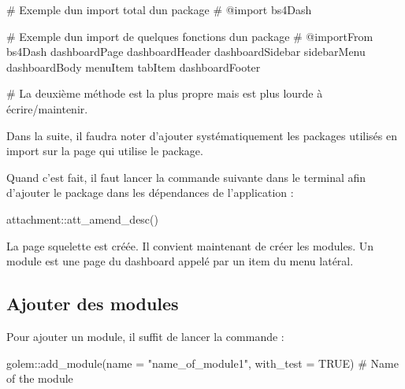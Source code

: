 \documentclass[
  letterpaper,
  DIV=11,
  numbers=noendperiod]{scrreprt}
\newenvironment{Shaded}{\begin{snugshade}}{\end{snugshade}}
\newcommand{\AttributeTok}[1]{\textcolor[rgb]{0.40,0.45,0.13}{#1}}
\newcommand{\CommentTok}[1]{\textcolor[rgb]{0.37,0.37,0.37}{#1}}
\newcommand{\ConstantTok}[1]{\textcolor[rgb]{0.56,0.35,0.01}{#1}}
\newcommand{\FunctionTok}[1]{\textcolor[rgb]{0.28,0.35,0.67}{#1}}
\newcommand{\NormalTok}[1]{\textcolor[rgb]{0.00,0.23,0.31}{#1}}
\newcommand{\SpecialCharTok}[1]{\textcolor[rgb]{0.37,0.37,0.37}{#1}}
\newcommand{\StringTok}[1]{\textcolor[rgb]{0.13,0.47,0.30}{#1}}
\begin{document}
\begin{Shaded}
\begin{Highlighting}[]
\CommentTok{\# Exemple d\textquotesingle{}un import total d\textquotesingle{}un package}
\CommentTok{\#\textquotesingle{} @import bs4Dash}

\CommentTok{\# Exemple d\textquotesingle{}un import de quelques fonctions d\textquotesingle{}un package}
\CommentTok{\#\textquotesingle{} @importFrom bs4Dash dashboardPage dashboardHeader dashboardSidebar sidebarMenu dashboardBody menuItem tabItem dashboardFooter}

\CommentTok{\# La deuxième méthode est la plus propre mais est plus lourde à écrire/maintenir.}
\end{Highlighting}
\end{Shaded}

Dans la suite, il faudra noter d'ajouter systématiquement les packages
utilisés en import sur la page qui utilise le package.

Quand c'est fait, il faut lancer la commande suivante dans le terminal
afin d'ajouter le package dans les dépendances de l'application :

\begin{Shaded}
\begin{Highlighting}[]
\NormalTok{attachment}\SpecialCharTok{::}\FunctionTok{att\_amend\_desc}\NormalTok{()}
\end{Highlighting}
\end{Shaded}

La page squelette est créée. Il convient maintenant de créer les
modules. Un module est une page du dashboard appelé par un item du menu
latéral.

\hypertarget{ajouter-des-modules}{%
\subsection{Ajouter des modules}\label{ajouter-des-modules}}

Pour ajouter un module, il suffit de lancer la commande :

\begin{Shaded}
\begin{Highlighting}[]
\NormalTok{golem}\SpecialCharTok{::}\FunctionTok{add\_module}\NormalTok{(}\AttributeTok{name =} \StringTok{"name\_of\_module1"}\NormalTok{, }\AttributeTok{with\_test =} \ConstantTok{TRUE}\NormalTok{) }\CommentTok{\# Name of the module}
\end{Highlighting}
\end{Shaded}
\end{document}
